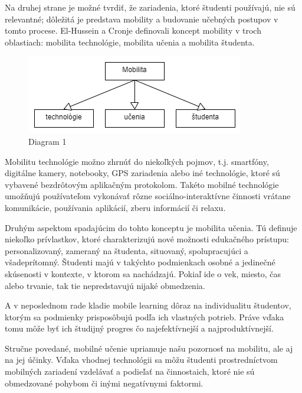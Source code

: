 \documentclass[10pt,oneside,slovak,a4paper]{article}
\begin{document}
Na druhej strane je možné tvrdiť, že zariadenia, ktoré študenti používajú, nie sú relevantné; dôležitá je predstava mobility a budovanie učebných postupov v tomto procese\cite{KukulskaHulme2009}. El-Hussein a Cronje\cite{Hussein} definovali koncept mobility v troch oblastiach: mobilita technológie, mobilita učenia a mobilita študenta\cite{Kim2012}.

\begin{figure}[htp]
	\centering
 	\includegraphics[scale=0.5]{diagram.png}
	\caption{Diagram 1}
	\label{fig: Oblasti mobility}
\end{figure}

Mobilitu technológie možno zhrnúť do niekoľkých pojmov, t.j. smartfóny, digitálne kamery, notebooky, GPS zariadenia alebo iné technológie, ktoré sú vybavené bezdrôtovým aplikačným protokolom. Takéto mobilné technológie umožňujú používateľom vykonávať rôzne sociálno-interaktívne činnosti vrátane komunikácie, používania aplikácií, zberu informácií či relaxu\cite{Kim2012}.

Druhým aspektom spadajúcim do tohto konceptu je mobilita učenia. Tú definuje niekoľko prívlastkov, ktoré charakterizujú nové možnosti edukačného prístupu: personalizovaný, zameraný na študenta, situovaný, spolupracujúci a všadeprítomný. Študenti majú v takýchto podmienkach osobné a jedinečné skúsenosti v kontexte, v ktorom sa nachádzajú. Pokiaľ ide o vek, miesto, čas alebo trvanie, tak tie nepredstavujú nijaké obmedzenia\cite{Kim2012}. 

A v neposlednom rade kladie mobile learning dôraz na individualitu študentov, ktorým sa podmienky prisposôbujú podľa ich vlastných potrieb. Práve vďaka tomu môže byť ich študijný progres čo najefektívnejší a najproduktívnejší.

Stručne povedané, mobilné učenie upriamuje našu pozornosť na mobilitu, ale aj na jej účinky. Vďaka vhodnej technológii sa môžu študenti prostredníctvom mobilných zariadení vzdelávať a podieľať na činnostaich, ktoré nie sú obmedzované pohybom či inými negatívnymi faktormi.

\end{document}
